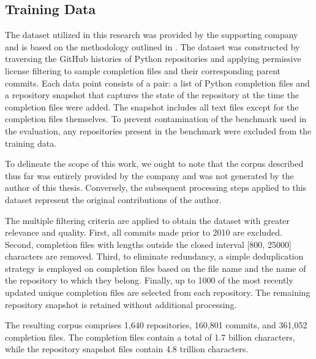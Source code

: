 \subsection{Training Data}

The dataset utilized in this research was provided by the supporting company and is based on the methodology outlined in \citet{bogomolov2024}. The dataset was constructed by traversing the GitHub histories of Python repositories and applying permissive license filtering to sample completion files and their corresponding parent commits. Each data point consists of a pair: a list of Python completion files and a repository snapshot that captures the state of the repository at the time the completion files were added. The snapshot includes all text files except for the completion files themselves. To prevent contamination of the benchmark used in the evaluation, any repositories present in the benchmark were excluded from the training data.

To delineate the scope of this work, we ought to note that the corpus described thus far was entirely provided by the company and was not generated by the author of this thesis. Conversely, the subsequent processing steps applied to this dataset represent the original contributions of the author.

The multiple filtering criteria are applied to obtain the dataset with greater relevance and quality. First, all commits made prior to 2010 are excluded. Second, completion files with lengths outside the closed interval [800, 25000] characters are removed. Third, to eliminate redundancy, a simple deduplication strategy is employed on completion files based on the file name and the name of the repository to which they belong. Finally, up to 1000 of the most recently updated unique completion files are selected from each repository. The remaining repository snapshot is retained without additional processing. \parencite{sapronov2025}

The resulting corpus comprises 1,640 repositories, 160,801 commits, and 361,052 completion files. The completion files contain a total of 1.7 billion characters, while the repository snapshot files contain 4.8 trillion characters.

